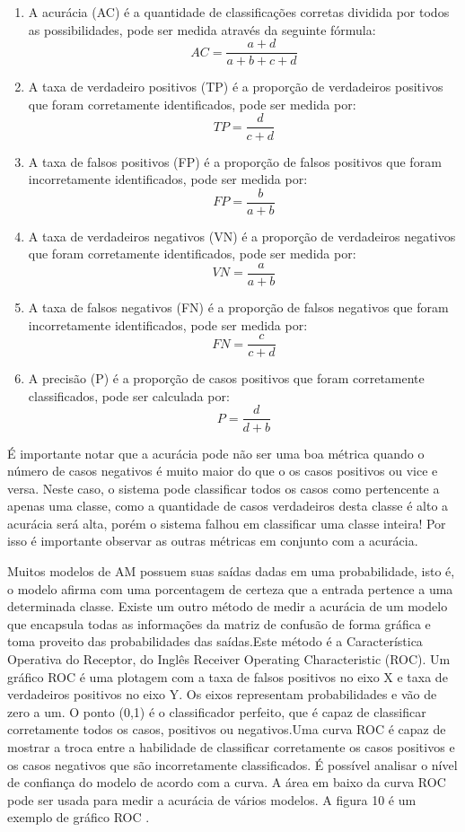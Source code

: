 \begin{enumerate}
\item A acurácia (AC) é a quantidade de classificações corretas dividida por todos as possibilidades, pode ser medida através da seguinte fórmula: 
 \[
       AC =  \frac{a + d}{a + b + c + d}
  \]

\item A taxa de verdadeiro positivos (TP) é a proporção de verdadeiros positivos que foram corretamente identificados, pode ser medida por:
 \[
       TP =  \frac{d}{ c + d}
  \]

\item A taxa de falsos positivos (FP) é a proporção de falsos positivos que foram incorretamente identificados, pode ser medida por:
 \[
       FP =  \frac{b}{ a + b}
  \]
  
\item A taxa de verdadeiros negativos (VN) é a proporção de verdadeiros negativos que foram corretamente identificados, pode ser medida por:
 \[
       VN =  \frac{a}{ a + b}
  \]
  
\item A taxa de falsos negativos (FN) é a proporção de falsos negativos que foram incorretamente identificados, pode ser medida por:
 \[
       FN =  \frac{c}{c + d}
  \]

\item A precisão (P) é a proporção de casos positivos que foram corretamente classificados, pode ser calculada por:
 \[
       P =  \frac{d}{d + b}
  \] 

\end{enumerate}

É importante notar que a acurácia pode não ser uma boa métrica quando o número de casos negativos é muito maior do que o os casos positivos ou vice e versa. Neste caso, o sistema pode classificar todos os casos como pertencente a apenas uma classe, como a quantidade de casos verdadeiros desta classe é alto a acurácia será alta, porém o sistema falhou em classificar uma classe inteira! Por isso é importante observar as outras métricas em conjunto com a acurácia.

Muitos modelos de AM possuem suas saídas dadas em uma probabilidade, isto é, o modelo afirma com uma porcentagem de certeza que a entrada pertence a uma determinada classe. Existe um outro método de medir a acurácia de um modelo que encapsula todas as informações da matriz de confusão de forma gráfica e toma proveito das probabilidades das saídas.Este método é a Característica Operativa do Receptor, do Inglês Receiver Operating Characteristic (ROC). Um gráfico ROC é uma plotagem com a taxa de falsos positivos no eixo X e taxa de verdadeiros positivos no eixo Y. Os eixos representam probabilidades e vão de zero a um. O ponto (0,1) é o classificador perfeito, que é capaz de classificar corretamente todos os casos, positivos ou negativos.Uma curva ROC é capaz de mostrar a troca entre a habilidade de classificar corretamente os casos positivos e os casos negativos que são incorretamente classificados. É possível  analisar o nível de confiança do modelo de acordo com a curva. A área em baixo da curva ROC pode ser usada para medir a acurácia de vários modelos. A figura 10 é um exemplo de gráfico ROC \cite{howard2012b}. 
  
